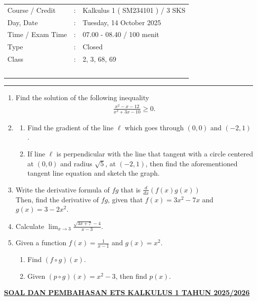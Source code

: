 \documentclass[10pt,openany,a4paper]{article}
\theoremstyle{definition}
\theoremstyle{definition}
\theoremstyle{plain}
\begin{document}
    \begin{center}
	\begin{tabular}{lcl}
		Course / Credit & : & Kalkulus 1 ( SM234101 ) / 3 SKS\\
		Day, Date & : & Tuesday, 14 October 2025\\
		Time / Exam Time & : & 07.00 - 08.40 / 100 menit\\
		Type & : & Closed\\
		Class & : & 2, 3, 68, 69\\
  ~
	\end{tabular}
    
    \noindent\rule{\textwidth}{2.pt}
        \end{center}
        \begin{enumerate}
            \item Find the solution of the following inequality 
            \begin{align*}
                \frac{x^2-x-12}{x^2+3x-10}\geq 0.
            \end{align*}
            \item \begin{enumerate}
                \item Find the gradient of the line $\ell$ which goes through $(0,0)$ and $(-2,1)$.
                \item If line $\ell$ is perpendicular with the line that tangent with a circle centered at $(0,0)$ and radius $\sqrt{5}$, at $(-2,1)$, then find the aforementioned tangent line equation and sketch the graph. 
            \end{enumerate}
            \item Write the derivative formula of $fg$ that is $\frac{d}{dx}(f(x)g(x))$\\
            Then, find the derivative of $fg$, given that $f(x)=3x^2-7x$ and $g(x)=3-2x^2$.
            \item Calculate $\displaystyle \lim_{x\to 3} \frac{\sqrt{3x+7}-4}{x-3}$.
            \item Given a function $f(x)=\frac{1}{x-1}$ and $g(x)=x^2$. 
            \begin{enumerate}
                \item Find $(f\circ g)(x)$.
                \item Given $(p\circ g)(x)=  x^2-3$, then find $p(x)$.
            \end{enumerate}
        \end{enumerate}
               \newpage
 \begin{center}
	{\underline{\textbf{\MakeUppercase{Soal dan Pembahasan ETS Kalkulus 1 Tahun 2025/2026}}}}
    \end{center}
\end{document}
